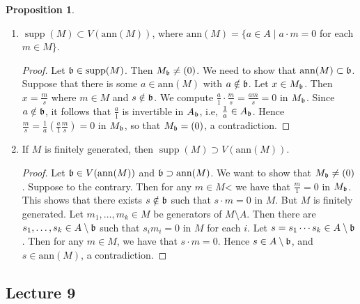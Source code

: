 \documentclass[10pt,letterpaper,cm]{nupset}
\theoremstyle{definition}
\newtheorem{prop}{Proposition}
\newcommand{\1}{\mathbf{1}}
\newcommand{\0}{\vec 0}
\DeclareMathOperator{\supp}{supp}
\begin{document}
\begin{prop} $ $
\begin{enumerate}
\item $\supp(M) \subset V(\text{ann}(M))$, where $\text{ann}(M) = \{a\in A \mid a\cdot m = 0$ for each $m\in M\}$. 
\begin{proof}
Let $\frak{b} \in \supp(M)$. Then $M_{\frak{b}} \ne (0)$. We need to show that $\text{ann}(M) \subset \frak{b}$.  Suppose that there is some $a\in \text{ann}(M)$ with $a\notin \frak{b}$. Let $x\in M_{\frak{b}}$. Then $x= \frac{m}{s}$ where $m\in M$ and $s\notin \frak{b}$. We compute $\frac{a}{1} \cdot \frac{m}{s} = \frac{am}{s} = 0$ in $M_{\frak{b}}$. Since $a\notin \frak{b}$, it follows that $\frac{a}{1}$ is invertible in $A_{\frak{b}}$, i.e, $\frac{1}{a} \in A_{\frak{b}}$. Hence $\frac{m}{s} = \frac{1}{a}(\frac{a}{1}\frac{m}{s}) = 0$ in $M_{\frak{b}}$, so that $M_{\frak{b}} = (0)$, a contradiction.  
\end{proof}
\item If $M$ is finitely generated, then  $\supp(M) \supset V(\text{ann}(M))$.
\begin{proof}
Let $\frak{b} \in V(\text{ann}(M))$ and $\frak{b} \supset \text{ann}(M)$. We want to show that $M_{\frak{b}} \ne (0)$. Suppose to the contrary. Then for any $m\in M$< we have that $\frac{m}{1} =0$ in $M_{\frak{b}}$. This shows that there exists $s\notin \frak{b}$ such that $s\cdot m = 0$ in $M$. But $M$ is finitely generated. Let $m_1, \ldots, m_k \in M$ be generators of $M \setminus A$. Then there are $s_1, \ldots, s_k \in A \setminus \frak{b}$ such that $s_im_i =0$ in $M$ for each $i$. Let $s = s_1 \cdots s_k \in A\setminus \frak{b}$. Then for any $m\in M$, we have that $s\cdot m = 0$. Hence $s\in A \setminus \frak{b}$, and $s\in \text{ann}(M)$, a contradiction. 
\end{proof}
\end{enumerate}
\end{prop}

\subsection{Lecture 9}
\end{document}

